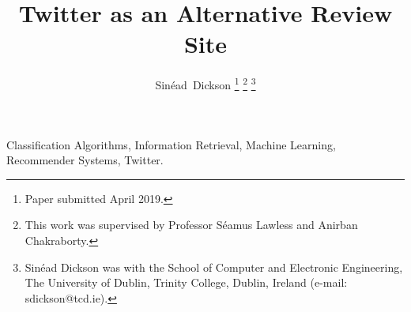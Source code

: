 \documentclass[journal]{IEEEtran}
\begin{document}
\title{Twitter as an Alternative Review Site}

\author{Sin\'ead~Dickson
\thanks{Paper submitted April 2019.}
\thanks{This work was supervised by Professor S\'eamus Lawless and Anirban Chakraborty.}
\thanks{Sin\'ead Dickson was with the School of Computer and Electronic Engineering, The University of Dublin, Trinity College, Dublin, Ireland (e-mail: sdickson@tcd.ie).}
}

\maketitle



\begin{IEEEkeywords}
Classification Algorithms, Information Retrieval, Machine Learning, Recommender Systems, Twitter.
\end{IEEEkeywords}







\newpage


\end{document}
